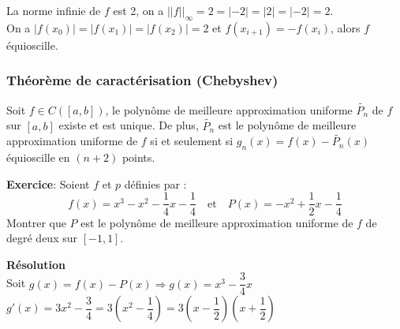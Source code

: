 
La norme infinie de $f$ est 2, on a $||f||_\infty = 2 = |-2| = |2| = |-2| = 2$. \\
On a $|f(x_0)| = |f(x_1)| = |f(x_2)| = 2$ et $f(x_{i+1}) = -f(x_i)$, alors $f$ équioscille.

\subsubsection*{Théorème de caractérisation (Chebyshev)}
Soit $f \in C([a,b])$, le polynôme de meilleure approximation uniforme $\tilde{P_n}$ de $f$ sur $[a,b]$ existe et est unique. De plus, $\tilde{P_n}$ est le polynôme de meilleure approximation uniforme de $f$ si et seulement si $g_n(x) = f(x) - \tilde{P_n}(x)$ équioscille en $(n+2)$ points.

\textbf{Exercice}: Soient $f$ et $p$ définies par :
$$f(x)=x^3-x^2-\dfrac{1}{4}x-\dfrac{1}{4} \quad \text{et} \quad P(x)=-x^2+\dfrac{1}{2}x-\dfrac{1}{4}$$
Montrer que $P$ est le polynôme de meilleure approximation uniforme de $f$ de degré deux sur $[-1,1]$.

\textbf{Résolution} \\
Soit $g(x)=f(x)-P(x) \Longrightarrow g(x)=x^3 -\dfrac{3}{4}x$ \\
$g'(x)=3x^2-\dfrac{3}{4}=3(x^2-\dfrac{1}{4})=3(x-\dfrac{1}{2})(x+\dfrac{1}{2})$ \\

 \\

